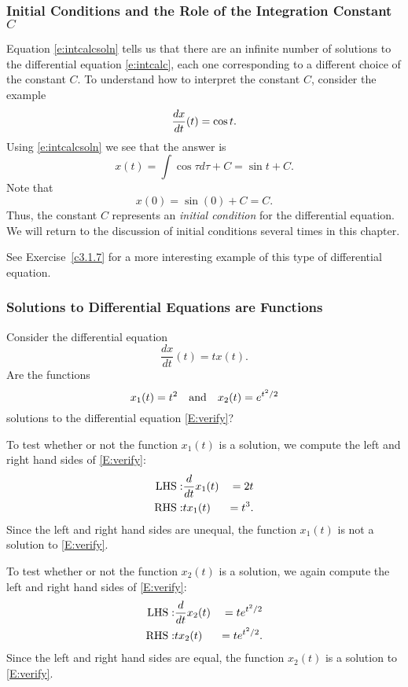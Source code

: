 \documentclass{ximera}
\begin{document}
\subsubsection*{Initial Conditions and the Role of the Integration Constant 
$C$}

Equation \eqref{e:intcalcsoln} tells us that there are an infinite number of
solutions to the differential equation \eqref{e:intcalc}, each one
corresponding to a different choice of the constant $C$.  To understand how
to interpret the constant $C$, consider the example
\[
\displaystyle\frac{dx}{dt}(t) = \cos t.
\]
Using \eqref{e:intcalcsoln} we see that the answer is
\[
x(t) = \int \cos\tau d\tau  + C = \sin t + C.
\]
Note that 
\[
x(0) = \sin(0) + C = C.
\]
Thus, the constant $C$ represents an {\em initial condition\/} for the  
differential equation.  We will return to the discussion of initial 
conditions several times in this chapter.

See Exercise~\ref{c3.1.7} for a more interesting example of this type of
differential equation.

\subsubsection*{Solutions to Differential Equations are Functions}

Consider the differential equation 
\begin{equation} \label{E:verify}
\frac{dx}{dt}(t) = tx(t).
\end{equation}
Are the functions
\[
x_1(t) = t^2 \quad\mbox{and}\quad x_2(t) = e^{t^2/2}
\]
solutions to the differential equation \eqref{E:verify}?

To test whether or not the function $x_1(t)$ is a solution, we compute
the left and right hand sides of \eqref{E:verify}:
\begin{eqnarray*}
{\rm LHS:} & \frac{d}{dt}x_1(t) & = 2t\\
{\rm RHS:} &  tx_1(t) & = t^3.
\end{eqnarray*}
Since the left and right hand sides are unequal, the function $x_1(t)$
is not a solution to \eqref{E:verify}.

To test whether or not the function $x_2(t)$ is a solution, we again
compute the left and right hand sides of \eqref{E:verify}:
\begin{eqnarray*}
{\rm LHS:} & \frac{d}{dt}x_2(t) & = te^{t^2/2}\\
{\rm RHS:} &  tx_2(t) & = te^{t^2/2}.
\end{eqnarray*}
Since the left and right hand sides are equal, the function $x_2(t)$
is a solution to \eqref{E:verify}.
\end{document}
